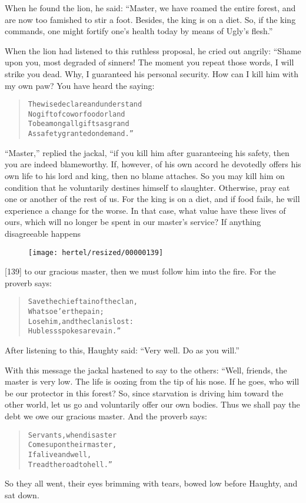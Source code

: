 \documentclass[article, twoside, 10pt]{memoir}
\renewenvironment{verbatim}{%
\begin{quote}%
\vskip -10pt%
\begin{alltt}\normalfont\small}{\end{alltt}%
\end{quote}%
\vskip -10pt
} %
\begin{document}
When he found the lion, he said:
``Master, we have roamed the entire forest, and are now too famished to stir a foot. Besides, the king is on a diet. So, if the king commands, one might fortify one's health today by means of Ugly's flesh.''

When the lion had listened to this ruthless proposal, he cried out
angrily: “Shame upon you, most degraded of sinners! The moment you
repeat those words, I will strike you dead. Why, I guaranteed his
personal security. How can I kill him with my own paw? You have
heard the saying:

\begin{verbatim}
The wise declare and understand
No gift of cow or food or land
To be among all gifts as grand
As safety granted on demand.”
\end{verbatim}
``Master,'' replied the jackal, “if you kill him after guaranteeing
his safety, then you are indeed blameworthy. If, however, of his
own accord he devotedly offers his own life to his lord and king,
then no blame attaches. So you may kill him on condition that he
voluntarily destines himself to slaughter. Otherwise, pray eat one
or another of the rest of us. For the king is on a diet, and if
food fails, he will experience a change for the worse. In that
case, what value have these lives of ours, which will no longer be
spent in our master's service? If anything disagreeable happens
\begin{figure}[p]\texttt{[image: hertel/resized/00000139]}\end{figure}[139] to our gracious master, then we must follow him into the
fire. For the proverb says:

\begin{verbatim}
Save the chieftain of the clan,
    Whatsoe'er the pain;
Lose him, and the clan is lost:
    Hubless spokes are vain.”
\end{verbatim}
After listening to this, Haughty said:
``Very well. Do as you will.''

With this message the jackal hastened to say to the others: “Well,
friends, the master is very low. The life is oozing from the tip of
his nose. If he goes, who will be our protector in this forest? So,
since starvation is driving him toward the other world, let us go
and voluntarily offer our own bodies. Thus we shall pay the debt we
owe our gracious master. And the proverb says:

\begin{verbatim}
Servants, when disaster
Comes upon their master,
If alive and well,
Tread the road to hell.”
\end{verbatim}
So they all went, their eyes brimming with tears, bowed low before
Haughty, and sat down.
\end{document}
